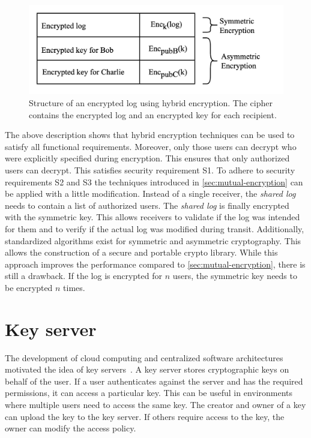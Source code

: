\documentclass[../main.tex]{subfiles}
\begin{document}
\begin{figure}[ht]
    \includegraphics[scale=0.23]{../img/04/hybrid_encryption.png}
    \centering
    \caption[Structure encrypted log]{Structure of an encrypted log using hybrid encryption. The cipher contains the encrypted log and an encrypted key for each recipient.}
    \label{fig:hybrid_encryption}
\end{figure}

The above description shows that hybrid encryption techniques can be used to satisfy all functional requirements.
Moreover, only those users can decrypt who were explicitly specified during encryption.
This ensures that only authorized users can decrypt.
This satisfies security requirement S1.
To adhere to security requirements S2 and S3 the techniques introduced in \cref{sec:mutual-encryption} can be applied with a little modification.
Instead of a single receiver, the \emph{shared log} needs to contain a list of authorized users.
The \emph{shared log} is finally encrypted with the symmetric key.
This allows receivers to validate if the log was intended for them and to verify if the actual log was modified during transit.
Additionally, standardized algorithms exist for symmetric and asymmetric cryptography.
This allows the construction of a secure and portable crypto library.
While this approach improves the performance compared to \cref{sec:mutual-encryption}, there is still a drawback.
If the log is encrypted for $n$ users, the symmetric key needs to be encrypted $n$ times.

\section{Key server}
\label{sec:key-server}

The development of cloud computing and centralized software architectures motivated the idea of key servers~\cite{Seitz2003}.
A key server stores cryptographic keys on behalf of the user.
If a user authenticates against the server and has the required permissions, it can access a particular key.
This can be useful in environments where multiple users need to access the same key.
The creator and owner of a key can upload the key to the key server.
If others require access to the key, the owner can modify the access policy.
\end{document}
